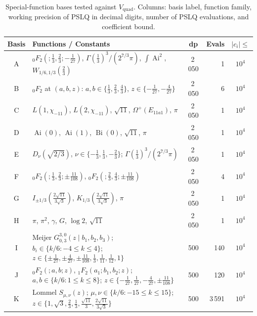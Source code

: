 \documentclass[11pt,a4paper]{article}
\theoremstyle{definition}
\theoremstyle{remark}
\DeclareMathOperator{\Ai}{Ai}
\DeclareMathOperator{\Bi}{Bi}
\newcommand{\Vq}{V_{\mathrm{quad}}}
\newcommand{\abs}[1]{\lvert #1 \rvert}
\begin{document}
\begin{table}[ht]
\centering
\caption{Special-function bases tested against $\Vq$.
Columns: basis label, function family, working precision of PSLQ in
decimal digits, number of PSLQ evaluations, and coefficient bound.}
\label{tab:bases}
\small
\begin{tabular}{@{}clcrc@{}}
\toprule
Basis & Functions / Constants & dp & Evals & $\abs{c_i}\!\le$ \\
\midrule
A & ${}_0F_2(;\tfrac13, \tfrac23; -\tfrac{1}{27})$,\;
    $\Gamma(\tfrac13)^3 / (2^{7/3}\pi)$,\;
    $\int \Ai^2$,\;
    $W_{1/6, 1/3}(\tfrac23)$
  & 2\,050 & 1 & $10^4$ \\[2pt]
B & ${}_0F_2$ at $(a,b,z)$: $a,b \in \{\tfrac13,\tfrac23,\tfrac43\}$,
    $z \in \{-\tfrac{1}{27}, -\tfrac{4}{27}\}$
  & 2\,050 & 6 & $10^4$ \\[2pt]
C & $L(1, \chi_{-11})$,\; $L(2, \chi_{-11})$,\;
    $\sqrt{11}$,\; $\Omega^+(E_{11a1})$,\; $\pi$
  & 2\,050 & 1 & $10^4$ \\[2pt]
D & $\Ai(0)$,\; $\Ai(1)$,\; $\Bi(0)$,\; $\sqrt{11}$,\; $\pi$
  & 2\,050 & 1 & $10^4$ \\[2pt]
E & $D_{\nu}(\sqrt{2/3})$, $\nu \in \{-\tfrac13, \tfrac13, -\tfrac23\}$;\;
    $\Gamma(\tfrac13)^3/(2^{7/3}\pi)$
  & 2\,050 & 1 & $10^4$ \\[2pt]
F & ${}_0F_2(;\tfrac13, \tfrac23; \pm\tfrac{11}{108})$,\;
    ${}_0F_2(;\tfrac23, \tfrac43; \pm\tfrac{11}{108})$
  & 2\,050 & 4 & $10^4$ \\[2pt]
G & $I_{\pm 1/3}(\tfrac{2\sqrt{11}}{3\sqrt{3}})$,\;
    $K_{1/3}(\tfrac{2\sqrt{11}}{3\sqrt{3}})$,\; $\pi$
  & 2\,050 & 1 & $10^4$ \\[2pt]
H & $\pi$, $\pi^2$, $\gamma$, $G$, $\log 2$, $\sqrt{11}$
  & 2\,050 & 1 & $10^4$ \\
\midrule
I & Meijer $G_{0,3}^{3,0}(z\mid b_1,b_2,b_3)$;
    $b_i \in \{k/6 : -4 \le k \le 4\}$;
    $z \in \{\pm\tfrac{1}{27}, \pm\tfrac{4}{27}, \pm\tfrac{11}{108},
    \tfrac13, \tfrac{1}{11}, \tfrac{1}{12}, 1\}$
  & 500 & 140 & $10^4$ \\[2pt]
J & ${}_0F_2(;a,b;z)$, ${}_1F_2(a_1;b_1,b_2;z)$;
    $a,b \in \{k/6 : 1 \le k \le 8\}$;
    $z \in \{-\tfrac{1}{27}, \tfrac{1}{27}, -\tfrac{4}{27},
    \pm\tfrac{11}{108}\}$
  & 500 & 120 & $10^4$ \\[2pt]
K & Lommel $S_{\mu,\nu}(z)$;\;
    $\mu,\nu \in \{k/6 : -15 \le k \le 15\}$;\;
    $z \in \{1, \sqrt{3}, \tfrac23, \tfrac13,
    \tfrac{\sqrt{11}}{3}, \tfrac{2\sqrt{11}}{3\sqrt3}\}$
  & 500 & 3\,591 & $10^4$ \\[2pt]

\end{tabular}
\end{table}
\end{document}
